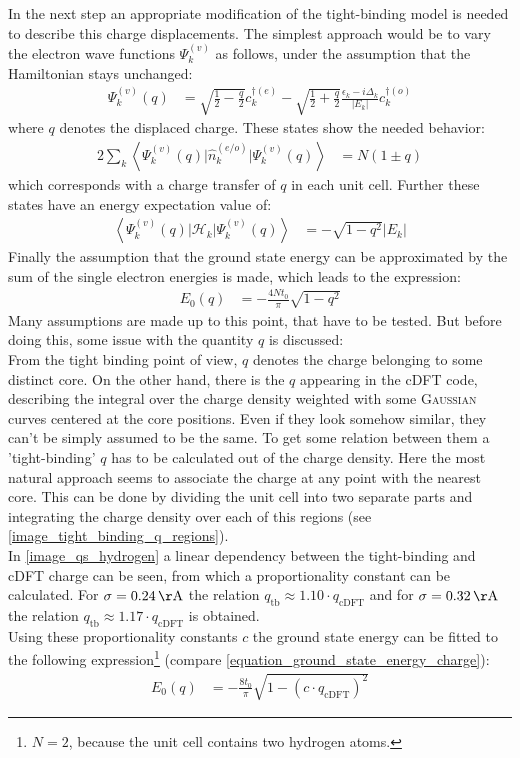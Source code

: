 In the next step an appropriate modification of the tight-binding model is needed to describe this charge displacements. The simplest approach would be to vary the electron wave functions $\Psi_k^{(v)}$ as follows, under the assumption that the Hamiltonian stays unchanged:
\begin{align}
\Psi_k^{(v)}(q) &= \sqrt{\frac{1}{2}-\frac{q}{2}}c_k^{\dagger(e)}- \sqrt{\frac{1}{2}+\frac{q}{2}}\frac{\epsilon_k - i \Delta_k}{|E_k|}c_{k}^{\dagger(o)}
\end{align}
where $q$ denotes the displaced charge. These states show the needed behavior:
\begin{align}
	2\sum_k\left\langle\Psi_k^{(v)}(q)\Big|\hat{n}_k^{(e/o)}\Big|\Psi_k^{(v)}(q)\right\rangle &= N \left(1 \pm q\right)
\end{align}
which corresponds with a charge transfer of $q$ in each unit cell. Further these states have an energy expectation value of:
\begin{align}
\left\langle\Psi_k^{(v)}(q)\Big|\mathcal{H}_{k}\Big|\Psi_k^{(v)}(q)\right\rangle &= -\sqrt{1-q^2} |E_k|
\label{equation_method_1_energies}
\end{align}
Finally the assumption that the ground state energy can be approximated by the sum of the single electron energies is made, which leads to the expression:
\begin{align}
E_0(q) &= -\frac{4Nt_0}{\pi} \sqrt{1-q^2}
\label{equation_ground_state_energy_charge}
\end{align}
Many assumptions are made up to this point, that have to be tested. But before doing this, some issue with the quantity $q$ is discussed:\\
From the tight binding point of view, $q$ denotes the charge belonging to some distinct core. On the other hand, there is the $q$ appearing in the cDFT code, describing the integral over the charge density weighted with some \textsc{Gaussian} curves centered at the core positions. Even if they look somehow similar, they can't be simply assumed to be the same. To get some relation between them a 'tight-binding' $q$ has to be calculated out of the charge density. Here the most natural approach seems to associate the charge at any point with the nearest core. This can be done by dividing the unit cell into two separate parts and integrating the charge density over each of this regions (see \cref{image_tight_binding_q_regions}).\\
In \cref{image_qs_hydrogen} a linear dependency between the tight-binding and cDFT charge can be seen, from which a proportionality constant can be calculated. For $\sigma = \unit[0.24]{\AA}$ the relation $q_\text{tb} \approx 1.10\cdot q_\text{cDFT}$ and for $\sigma = \unit[0.32]{\AA}$ the relation $q_\text{tb} \approx 1.17\cdot q_\text{cDFT}$ is obtained.\\
Using these proportionality constants $c$ the ground state energy can be fitted to the following expression\footnote{$N=2$, because the unit cell contains two hydrogen atoms.} (compare \cref{equation_ground_state_energy_charge}):
\begin{align}
	E_0(q) &= -\frac{8t_0}{\pi} \sqrt{1 - \left(c\cdot q_\text{cDFT}\right)^2}
\end{align}

